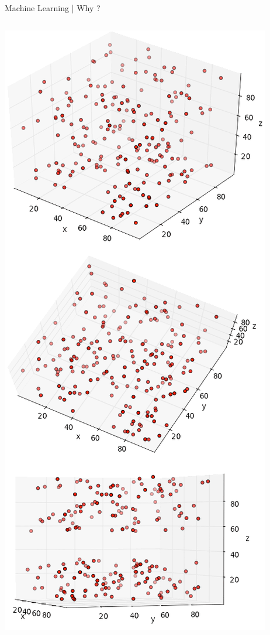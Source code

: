 \documentclass[10pt]{beamer}
\begin{document}
\begin{frame}{Machine Learning | Why ?}
\begin{columns}
\begin{column}{0.5\textwidth}
\begin{center}
							\includegraphics[height=0.9\textheight]{images/pca-merge}
						\end{center}
					\end{column}
				\end{columns}
			\end{frame}	
\end{document}
